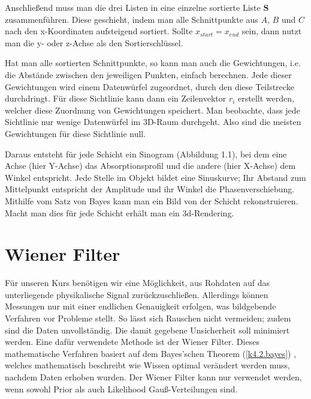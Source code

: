 \documentclass[]{dsadokumentation}
\begin{document}
Anschließend muss man die drei Listen in eine einzelne sortierte Liste $\mathbf{S}$ zusammenführen. Diese geschieht, indem man alle Schnittpunkte aus $A$, $B$ und $C$ nach den x-Koordinaten aufsteigend sortiert. Sollte $x_{start} = x_{end}$ sein, dann nutzt man die y- oder z-Achse als den Sortierschlüssel.

Hat man alle sortierten Schnittpunkte, so kann man auch die Gewichtungen, i.e. die Abstände zwischen den jeweiligen Punkten, einfach berechnen. Jede dieser Gewichtungen wird einem Datenwürfel zugeordnet, durch den diese Teilstrecke durchdringt. Für diese Sichtlinie kann dann ein Zeilenvektor $r_i$ erstellt werden, welcher diese Zuordnung von Gewichtungen speichert. Man beobachte, dass jede Sichtlinie nur wenige Datenwürfel im 3D-Raum durchgeht. Also sind die meisten Gewichtungen für diese Sichtlinie null.

Daraus entsteht für jede Schicht ein Sinogram (Abbildung 1.1), bei dem eine Achse (hier Y-Achse) das Absorptionsprofil und die andere (hier X-Achse) dem Winkel entspricht. Jede Stelle im Objekt bildet eine Sinuskurve; Ihr Abstand zum Mittelpunkt entspricht der Amplitude und ihr Winkel die Phasenverschiebung. Mithilfe vom Satz von Bayes kann man ein Bild von der Schicht rekonstruieren. Macht man dies für jede Schicht erhält man ein 3d-Rendering.

\section{Wiener Filter}\label{k4.2.wiener.filter}

Für unseren Kurs benötigen wir eine Möglichkeit, aus Rohdaten auf das unterliegende physikalische Signal zurückzuschließen. Allerdings können Messungen nur mit einer endlichen Genauigkeit erfolgen, was bildgebende Verfahren vor Probleme stellt. So lässt sich Rauschen nicht vermeiden; zudem sind die Daten unvollständig. Die damit gegebene Unsicherheit soll minimiert werden. Eine dafür verwendete Methode ist der Wiener Filter.
Dieses mathematische Verfahren basiert auf dem Bayes'schen Theorem
(\ref{k4.2.bayes})
, welches mathematisch beschreibt wie Wissen optimal verändert werden muss, nachdem Daten erhoben wurden. Der Wiener Filter kann nur verwendet werden, wenn sowohl Prior als auch Likelihood Gauß-Verteilungen sind.
\end{document}
